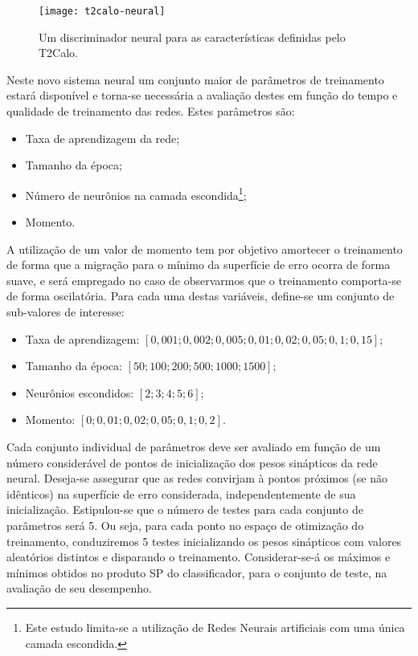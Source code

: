 \begin{figure}
\begin{center}
\texttt{[image: t2calo-neural]}
\end{center}
\caption{Um discriminador neural para as características definidas pelo
T2Calo.}
\label{fig:t2calo-neural}
\end{figure}

Neste novo sistema neural um conjunto maior de parâmetros de treinamento
estará disponível e torna-se necessária a avaliação destes em função do tempo
e qualidade de treinamento das redes. Estes parâmetros são:

\begin{itemize}
\item Taxa de aprendizagem da rede;
\item Tamanho da época;
\item Número de neurônios na camada escondida\footnote{Este estudo
limita-se a utilização de Redes Neurais artificiais com uma única camada
escondida.};
\item Momento.
\end{itemize}

A utilização de um valor de momento tem por objetivo amortecer o treinamento
de forma que a migração para o mínimo da superfície de erro ocorra de forma
suave, e será empregado no caso de observarmos que o treinamento comporta-se
de forma oscilatória. Para cada uma destas variáveis, define-se um conjunto de
sub-valores de interesse:

\begin{itemize}
\item Taxa de aprendizagem: $[0,001; 0,002; 0,005; 0,01; 0,02; 0,05; 0,1;
0,15]$;
\item Tamanho da época: $[50; 100; 200; 500; 1000; 1500]$;
\item Neurônios escondidos: $[2; 3; 4; 5; 6]$;
\item Momento: $[0; 0,01; 0,02; 0,05; 0,1; 0,2]$.
\end{itemize}

Cada conjunto individual de parâmetros deve ser avaliado em função de um
número considerável de pontos de inicialização dos pesos sinápticos da rede
neural. Deseja-se assegurar que as redes convirjam à pontos próximos (se não
idênticos) na superfície de erro considerada, independentemente de sua
inicialização. Estipulou-se que o número de testes para cada conjunto de
parâmetros será 5. Ou seja, para cada ponto no espaço de otimização do
treinamento, conduziremos 5 testes inicializando os pesos sinápticos com
valores aleatórios distintos e disparando o treinamento. Considerar-se-á os
máximos e mínimos obtidos no produto SP do classificador, para o conjunto de
teste, na avaliação de seu desempenho.

